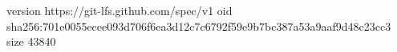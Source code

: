 version https://git-lfs.github.com/spec/v1
oid sha256:701e0055ecee093d706f6ea3d12c7c6792f59e9b7bc387a53a9aaf9d48c23cc3
size 43840
